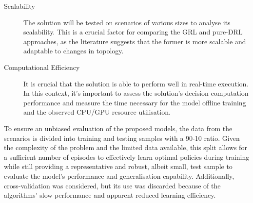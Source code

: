 \begin{description}
	\item[Scalability]  The solution will be tested on scenarios of various sizes to analyse its scalability. This is a crucial factor for comparing the \ac{GRL} and pure-\ac{DRL} approaches, as the literature suggests that the former is more scalable and adaptable to changes in topology.
	
	\item[Computational Efficiency] It is crucial that the solution is able to perform well in real-time execution. In this context, it's important to assess the solution's decision computation performance and measure the time necessary for the model offline training and the observed CPU/GPU resource utilisation.
\end{description}
	
	To ensure an unbiased evaluation of the proposed models, the data from the scenarios is divided into training and testing samples with a 90-10 ratio. Given the complexity of the problem and the limited data available, this split allows for a sufficient number of episodes to effectively learn optimal policies during training while still providing a representative and robust, albeit small, test sample to evaluate the model's performance and generalisation capability. Additionally, cross-validation was considered, but its use was discarded because of the algorithms' slow performance and apparent reduced learning efficiency.
